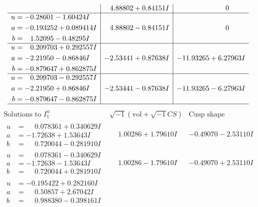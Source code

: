 \documentclass[1p]{elsarticle_modified}
\theoremstyle{definition}
\newcommand{\I}{\sqrt{-1}}
\begin{document}
$$\begin{array}{c|c|c}
 & \phantom{-}4.88802 + 0.84151 I & \phantom{-0.000000 } 0 \\ \hline\begin{aligned}
u &= -0.28601 - 1.60424 I \\
a &= -0.193252 + 0.089414 I \\
b &= \phantom{-}1.52095 - 0.48295 I\end{aligned}
 & \phantom{-}4.88802 - 0.84151 I & \phantom{-0.000000 } 0 \\ \hline\begin{aligned}
u &= \phantom{-}0.209703 + 0.292557 I \\
a &= -2.21950 - 0.86846 I \\
b &= -0.879647 + 0.862875 I\end{aligned}
 & -2.53441 + 0.87638 I & -11.93265 + 6.27963 I \\ \hline\begin{aligned}
u &= \phantom{-}0.209703 - 0.292557 I \\
a &= -2.21950 + 0.86846 I \\
b &= -0.879647 - 0.862875 I\end{aligned}
 & -2.53441 - 0.87638 I & -11.93265 - 6.27963 I\\
 \hline 
 \end{array}$$\newpage$$\begin{array}{c|c|c}  
\text{Solutions to }I^u_{1}& \I (\text{vol} + \sqrt{-1}CS) & \text{Cusp shape}\\
 \hline 
\begin{aligned}
u &= \phantom{-}0.078361 + 0.340629 I \\
a &= -1.72638 + 1.53643 I \\
b &= \phantom{-}0.720044 - 0.281910 I\end{aligned}
 & \phantom{-}1.00286 + 1.79610 I & -0.49070 - 2.53110 I \\ \hline\begin{aligned}
u &= \phantom{-}0.078361 - 0.340629 I \\
a &= -1.72638 - 1.53643 I \\
b &= \phantom{-}0.720044 + 0.281910 I\end{aligned}
 & \phantom{-}1.00286 - 1.79610 I & -0.49070 + 2.53110 I \\ \hline\begin{aligned}
u &= -0.195422 + 0.282160 I \\
a &= \phantom{-}0.50857 + 2.67042 I \\
b &= \phantom{-}0.988380 - 0.398161 I\end{aligned}

\end{array}$$
\end{document}
